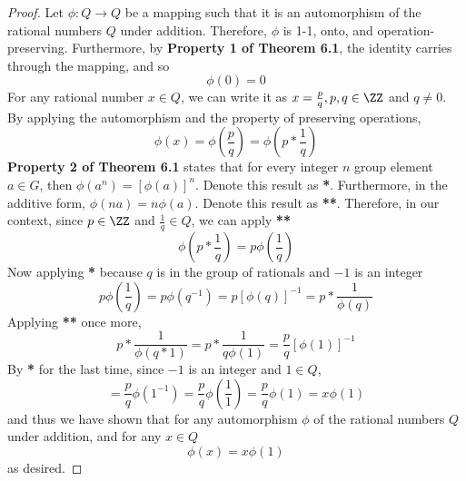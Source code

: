 \documentclass[12pt]{scrartcl}
\begin{document}
\begin{proof}
  Let $\phi: Q \to Q$ be a mapping such that it is an automorphism of the rational numbers $Q$ under addition. 
  Therefore, $\phi$ is 1-1, onto, and operation-preserving. Furthermore, by \textbf{Property 1 of Theorem 6.1}, the identity carries through the mapping, and so
  \[\phi(0) = 0\]
  For any rational number $x \in Q$, we can write it as $x = \frac{p}{q}, p, q \in \ZZ$ and $q \neq 0$. 
  By applying the automorphism and the property of preserving operations, 
  \[\phi(x) = \phi\left(\frac{p}{q}\right) = \phi\left(p * \frac{1}{q}\right)\]
  \textbf{Property 2 of Theorem 6.1} states that for every integer $n$ group element $a \in G$, then $\phi(a^n) = [\phi(a)]^n$. Denote this result as \textbf{*}. Furthermore, in the additive form, 
  $\phi(na) = n\phi(a)$. Denote this result as \textbf{**}.
  Therefore, in our context, since $p \in \ZZ$ and $\frac{1}{q} \in Q$, we can apply \textbf{**}
  \[\phi\left(p * \frac{1}{q}\right) = p\phi\left(\frac{1}{q}\right)\] 
  Now applying \textbf{*} because $q$ is in the group of rationals and $-1$ is an integer 
  \[p\phi\left(\frac{1}{q}\right) = p\phi(q^{-1}) = p[\phi(q)]^{-1} = p * \frac{1}{\phi(q)}\]
  Applying \textbf{**} once more, 
  \[p * \frac{1}{\phi(q * 1)} = p * \frac{1}{q \phi(1)} = \frac{p}{q} [\phi(1)]^{-1}\]
  By \textbf{*} for the last time, since $-1$ is an integer and $1 \in Q$, 
  \[= \frac{p}{q}\phi(1^{-1}) = \frac{p}{q}\phi\left(\frac{1}{1}\right) = \frac{p}{q}\phi(1) = x\phi(1)\]
  and thus we have shown that for any automorphism $\phi$ of the rational numbers $Q$ under addition, and 
  for any $x \in Q$
  \[\phi(x) = x\phi(1)\]
  as desired. 
\end{proof}
\end{document}
